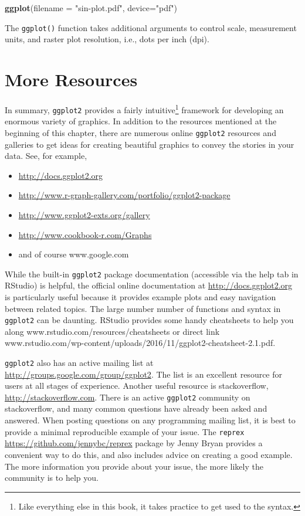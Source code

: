 \documentclass[]{krantz}
\makeatletter
\newenvironment{Shaded}{\begin{snugshade}}{\end{snugshade}}
\newcommand{\DataTypeTok}[1]{\textcolor[rgb]{0.27,0.27,0.27}{#1}}
\newcommand{\KeywordTok}[1]{\textcolor[rgb]{0.27,0.27,0.27}{\textbf{#1}}}
\newcommand{\NormalTok}[1]{#1}
\newcommand{\StringTok}[1]{\textcolor[rgb]{0.5,0.5,0.5}{#1}}
\providecommand{\tightlist}{%
  \setlength{\itemsep}{0pt}\setlength{\parskip}{0pt}}
\newenvironment{kframe}{%
\medskip{}
\setlength{\fboxsep}{.8em}
 \def\at@end@of@kframe{}%
 \ifinner\ifhmode%
  \def\at@end@of@kframe{\end{minipage}}%
  \begin{minipage}{\columnwidth}%
 \fi\fi%
 \def\FrameCommand##1{\hskip\@totalleftmargin \hskip-\fboxsep
 \colorbox{shadecolor}{##1}\hskip-\fboxsep
     \hskip-\linewidth \hskip-\@totalleftmargin \hskip\columnwidth}%
 \MakeFramed {\advance\hsize-\width
   \@totalleftmargin\z@ \linewidth\hsize
   \@setminipage}}%
 {\par\unskip\endMakeFramed%
 \at@end@of@kframe}
\renewenvironment{Shaded}{\begin{kframe}}{\end{kframe}}
\makeatother
\begin{document}
\begin{Shaded}
\begin{Highlighting}[]
\KeywordTok{ggplot}\NormalTok{(}\DataTypeTok{filename =} \StringTok{"sin-plot.pdf"}\NormalTok{, }\DataTypeTok{device=}\StringTok{"pdf"}\NormalTok{)}
\end{Highlighting}
\end{Shaded}

The \texttt{ggplot()} function takes additional arguments to control scale, measurement units, and raster plot resolution, i.e., dots per inch (dpi).

\hypertarget{more-resources}{%
\section{More Resources}\label{more-resources}}

In summary, \texttt{ggplot2} provides a fairly intuitive\footnote{Like everything else in this book, it takes practice to get used to the syntax.} framework for developing an enormous variety of graphics. In addition to the resources mentioned at the beginning of this chapter, there are numerous online \texttt{ggplot2} resources and galleries to get ideas for creating beautiful graphics to convey the stories in your data. See, for example,

\begin{itemize}
\tightlist
\item
  \url{http://docs.ggplot2.org}
\item
  \url{http://www.r-graph-gallery.com/portfolio/ggplot2-package}
\item
  \url{http://www.ggplot2-exts.org/gallery}
\item
  \url{http://www.cookbook-r.com/Graphs}
\item
  and of course www.google.com
\end{itemize}

While the built-in \texttt{ggplot2} package documentation (accessible via the help tab in RStudio) is helpful, the official online documentation at \url{http://docs.ggplot2.org} is particularly useful because it provides example plots and easy navigation between related topics. The large number number of functions and syntax in \texttt{ggplot2} can be daunting. RStudio provides some handy cheatsheets to help you along www.rstudio.com/resources/cheatsheets or direct link www.rstudio.com/wp-content/uploads/2016/11/ggplot2-cheatsheet-2.1.pdf.

\texttt{ggplot2} also has an active mailing list at \url{http://groups.google.com/group/ggplot2}. The list is an excellent resource for users at all stages of experience. Another useful resource is stackoverflow, \url{http://stackoverflow.com}. There is an active \texttt{ggplot2} community on stackoverflow, and many common questions have already been asked and answered. When posting questions on any programming mailing list, it is best to provide a minimal reproducible example of your issue. The \texttt{reprex} \url{https://github.com/jennybc/reprex} package by Jenny Bryan provides a convenient way to do this, and also includes advice on creating a good example. The more information you provide about your issue, the more likely the community is to help you.
\end{document}
